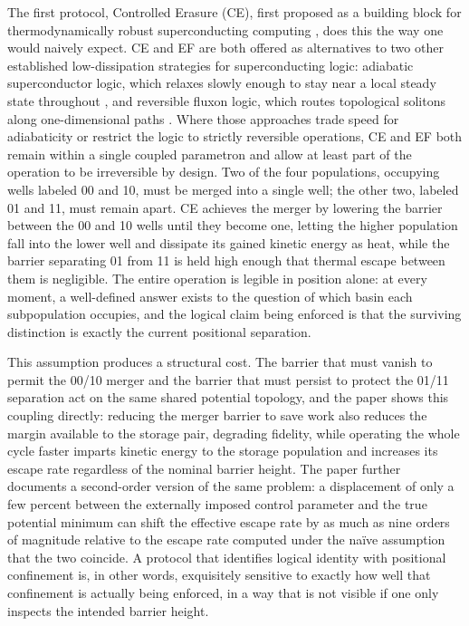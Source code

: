 \documentclass[11pt]{article}
\begin{document}
The first protocol, Controlled Erasure (CE), first proposed as a building block for thermodynamically robust superconducting computing \cite{PrattRayCrutchfield2025}, does this the way one would naively expect. CE and EF are both offered as alternatives to two other established low-dissipation strategies for superconducting logic: adiabatic superconductor logic, which relaxes slowly enough to stay near a local steady state throughout \cite{TakeuchiYamanashiYoshikawa2015}, and reversible fluxon logic, which routes topological solitons along one-dimensional paths \cite{WustmannOsborn2020}. Where those approaches trade speed for adiabaticity or restrict the logic to strictly reversible operations, CE and EF both remain within a single coupled parametron and allow at least part of the operation to be irreversible by design. Two of the four populations, occupying wells labeled 00 and 10, must be merged into a single well; the other two, labeled 01 and 11, must remain apart. CE achieves the merger by lowering the barrier between the 00 and 10 wells until they become one, letting the higher population fall into the lower well and dissipate its gained kinetic energy as heat, while the barrier separating 01 from 11 is held high enough that thermal escape between them is negligible. The entire operation is legible in position alone: at every moment, a well-defined answer exists to the question of which basin each subpopulation occupies, and the logical claim being enforced is that the surviving distinction is exactly the current positional separation.

This assumption produces a structural cost. The barrier that must vanish to permit the 00/10 merger and the barrier that must persist to protect the 01/11 separation act on the same shared potential topology, and the paper shows this coupling directly: reducing the merger barrier to save work also reduces the margin available to the storage pair, degrading fidelity, while operating the whole cycle faster imparts kinetic energy to the storage population and increases its escape rate regardless of the nominal barrier height. The paper further documents a second-order version of the same problem: a displacement of only a few percent between the externally imposed control parameter and the true potential minimum can shift the effective escape rate by as much as nine orders of magnitude relative to the escape rate computed under the na\"ive assumption that the two coincide. A protocol that identifies logical identity with positional confinement is, in other words, exquisitely sensitive to exactly how well that confinement is actually being enforced, in a way that is not visible if one only inspects the intended barrier height.
\end{document}
